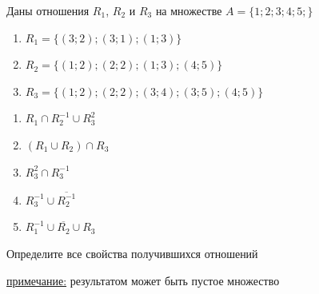 \question
Даны отношения $R_1$, $R_2$ и $R_3$ на множестве $A = \{1; 2; 3; 4; 5;\}$ 
\begin{enumerate}
	\renewcommand{\labelenumi}{\alph{enumi})}
	\item $R_1 = \{(3; 2); (3; 1); (1; 3)\}$
	\item $R_2 = \{(1; 2); (2; 2); (1; 3); (4; 5)\}$
	\item $R_3 = \{(1; 2); (2; 2); (3; 4); (3; 5); (4; 5)\}$
\end{enumerate}

\begin{enumerate}
	\renewcommand{\labelenumi}{\alph{enumi})}
	\item $R_1 \cap R_2^{-1} \cup R_3^2$
	\item $(R_1 \cup R_2) \cap R_3$
	\item $R_3^2 \cap R_3^{-1}$
	\item $R_3^{-1} \cup \overline{R_2^{-1}}$
	\item $R_1^{-1} \cup \overline{R_2} \cup R_3$
\end{enumerate}

Определите все свойства получившихся отношений

\underline{примечание:} результатом может быть пустое множество